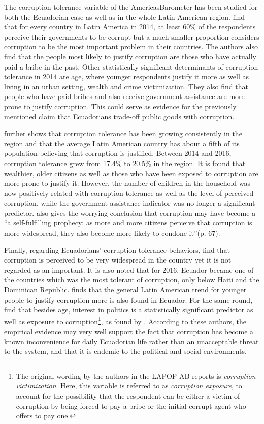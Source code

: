 \documentclass[12pt,a4]{article}\usepackage[]{graphicx}\usepackage[]{xcolor}
\begin{document}
The corruption tolerance variable of the AmericasBarometer has been studied for both the Ecuadorian case as well as in the whole Latin-American region. \textcite{Singer.2016} find that for every country in Latin America in 2014, at least 60\% of the respondents perceive their governments to be corrupt but a much smaller proportion considers corruption to be the most important problem in their countries. The authors also find that the people most likely to justify corruption are those who have actually paid a bribe in the past. Other statistically significant determinants of corruption tolerance in 2014 are age, where younger respondents justify it more as well as living in an urban setting, wealth and crime victimization. They also find that people who have paid bribes and also receive government assistance are more prone to justify corruption. This could serve as evidence for the previously mentioned claim that Ecuadorians trade-off public goods with corruption.

\textcite{Lupu.2017} further shows that corruption tolerance has been growing consistently in the region and that the average Latin American country has about a fifth of its population believing that corruption is justified. Between 2014 and 2016, corruption tolerance grew from 17.4\% to 20.5\% in the region. It is found that wealthier, older citizens as well as those who have been exposed to corruption are more prone to justify it. However, the number of children in the household was now positively related with corruption tolerance as well as the level of perceived corruption, while the government assistance indicator was no longer a significant predictor. \textcite{Lupu.2017} also gives the worrying conclusion that corruption may have become a \enquote{a self-fulfilling prophecy: as more and more citizens perceive that corruption is more widespread, they also become more likely to condone it}(p. 67). 

Finally, regarding Ecuadorians' corruption tolerance behaviors, \textcite{Moscoso.2018} find that corruption is perceived to be very widespread in the country yet it is not regarded as an important. It is also noted that for 2016, Ecuador became one of the countries which was the most tolerant of corruption, only below Haiti and the Dominican Republic. \textcite{Montalvo.2019} finds that the general Latin American trend for younger people to justify corruption more is also found in Ecuador. For the same round, \textcite{Moscoso.2020} find that besides age, interest in politics is a statistically significant predictor as well as exposure to corruption\footnote{The original wording by the authors in the LAPOP AB reports is \textit{corruption victimization}. Here, this variable is referred to as \textit{corruption exposure}, to account for the possibility that the respondent can be either a victim of corruption by being forced to pay a bribe or the initial corrupt agent who offers to pay one.}, as found by \textcite{Lupu.2017}. According to these authors, the empirical evidence may very well support the fact that corruption has become a known inconvenience for daily Ecuadorian life rather than an unacceptable threat to the system, and that it is endemic to the political and social environments. 
\end{document}
